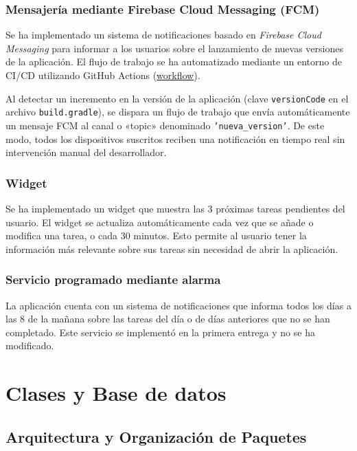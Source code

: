 \documentclass{article}
\begin{document}
\subsubsection{Mensajería mediante Firebase Cloud Messaging (FCM)}

Se ha implementado un sistema de notificaciones basado en \textit{Firebase Cloud Messaging} para informar a los usuarios sobre el lanzamiento de nuevas versiones de la aplicación. El flujo de trabajo se ha automatizado mediante un entorno de CI/CD utilizando GitHub Actions (\href{https://github.com/GonzaloPerezGomez/DASPROYECTO/blob/das-002/.github/workflows/notify_new_version.yml}{workflow}).

Al detectar un incremento en la versión de la aplicación (clave \texttt{versionCode} en el archivo \texttt{build.gradle}), se dispara un flujo de trabajo que envía automáticamente un mensaje FCM al canal o «topic» denominado \texttt{'nueva\_version'}. De este modo, todos los dispositivos suscritos reciben una notificación en tiempo real sin intervención manual del desarrollador.

\subsubsection{Widget}

Se ha implementado un widget que muestra las 3 próximas tareas pendientes del usuario. El widget se actualiza automáticamente cada vez que se añade o modifica una tarea, o cada 30 minutos. Esto permite al usuario tener la información más relevante sobre sus tareas sin necesidad de abrir la aplicación.

\subsubsection{Servicio programado mediante alarma}

La aplicación cuenta con un sistema de notificaciones que informa todos los días a las 8 de la mañana sobre las tareas del día o de días anteriores que no se han completado. Este servicio se implementó en la primera entrega y no se ha modificado.

\newpage


\section{Clases y Base de datos}


\subsection{Arquitectura y Organización de Paquetes}
\end{document}
